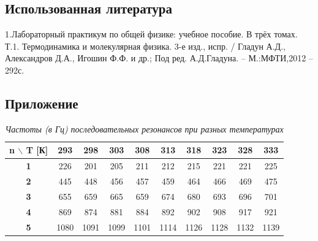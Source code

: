 \documentclass[a4paper, fontsize = 14pt]{article}
\begin{document}
\subsection*{Использованная литература}

1.Лабораторный практикум по общей физике: учебное пособие. В трёх томах. Т.1. Термодинамика и молекулярная физика. 3-е изд., испр. / Гладун А.Д., Александров Д.А., Игошин Ф.Ф. и др.; Под ред. А.Д.Гладуна. – М.:МФТИ,2012 – 292с.

\newpage

\subsection*{Приложение}

\begin{table}[htb]
\centering
\caption{\textit{Частоты (в Гц) последовательных резонансов при разных температурах}}
\begin{tabular}{|c|c|c|c|c|c|c|c|c|c|}
\hline
\textbf{n $\backslash$ T [К]} & \textbf{293} & \textbf{298} & \textbf{303} & \textbf{308} & \textbf{313} & \textbf{318} & \textbf{323} & \textbf{328} & \textbf{333} \\ \hline
\textbf{1}                    & 226          & 201          & 205          & 211          & 212          & 215          & 221          & 221          & 225          \\ \hline
\textbf{2}                    & 445          & 448          & 456          & 457          & 459          & 464          & 466          & 469          & 475          \\ \hline
\textbf{3}                    & 655          & 659          & 665          & 659          & 674          & 680          & 693          & 696          & 701          \\ \hline
\textbf{4}                    & 869          & 874          & 881          & 884          & 892          & 902          & 908          & 917          & 921          \\ \hline
\textbf{5}                    & 1080         & 1091         & 1099         & 1101         & 1114         & 1126         & 1128         & 1132         & 1139         \\ \hline
\end{tabular}
\end{table}
\end{document}
